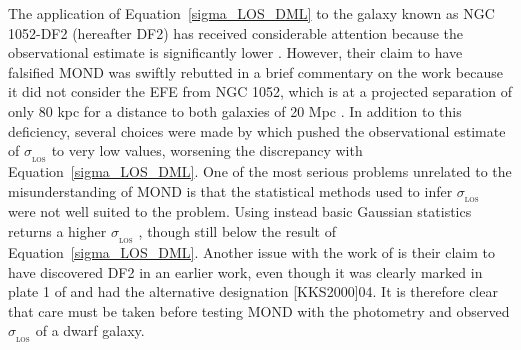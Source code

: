 \documentclass[fleqn,usenatbib,useAMS]{mnras} %
\begin{document}
The application of Equation~\ref{sigma_LOS_DML} to the galaxy known as NGC 1052-DF2 (hereafter DF2) has received considerable attention because the observational estimate is significantly lower \citep{Van_Dokkum_2018}. However, their claim to have falsified MOND was swiftly rebutted in a brief commentary on the work because it did not consider the EFE from NGC 1052, which is at a projected separation of only 80 kpc \citep{Kroupa_2018_DF2} for a distance to both galaxies of 20 Mpc \citep{Shen_2021}. In addition to this deficiency, several choices were made by \citet{Van_Dokkum_2018} which pushed the observational estimate of $\sigma_{_\text{LOS}}$ to very low values, worsening the discrepancy with Equation~\ref{sigma_LOS_DML}. One of the most serious problems unrelated to the misunderstanding of MOND is that the statistical methods used to infer $\sigma_{_\text{LOS}}$ were not well suited to the problem. Using instead basic Gaussian statistics returns a higher $\sigma_{_\text{LOS}}$ \citep{Martin_2018, Haghi_2019_DF2}, though still below the result of Equation~\ref{sigma_LOS_DML}. Another issue with the work of \citet{Van_Dokkum_2018} is their claim to have discovered DF2 in an earlier work, even though it was clearly marked in plate 1 of \citet{Fosbury_1978} and had the alternative designation [KKS2000]04. It is therefore clear that care must be taken before testing MOND with the photometry and observed $\sigma_{_\text{LOS}}$ of a dwarf galaxy.
\end{document}
